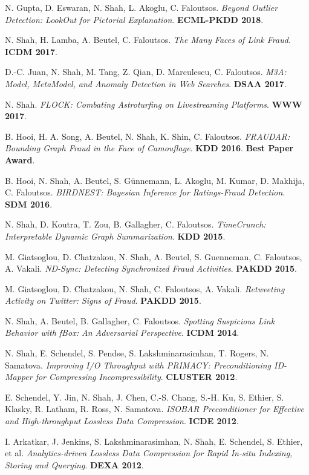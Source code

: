 \documentclass{article}
\begin{document}
\begin{etaremune}[itemsep=1pt,parsep=0pt]
\item N. Gupta, D. Eswaran, N. Shah, L. Akoglu, C. Faloutsos. \emph{Beyond Outlier Detection: LookOut for Pictorial Explanation}. \textbf{ECML-PKDD 2018}.
\item N. Shah, H. Lamba, A. Beutel, C. Faloutsos. \emph{The Many Faces of Link Fraud}. \textbf{ICDM 2017}.
\item D.-C. Juan, N. Shah, M. Tang, Z. Qian, D. Marculescu, C. Faloutsos. \emph{M3A: Model, MetaModel, and Anomaly Detection in Web Searches}. \textbf{DSAA 2017}.
\item N. Shah. \emph{FLOCK: Combating Astroturfing on Livestreaming Platforms}. \textbf{WWW 2017}.
\item B. Hooi, H. A. Song, A. Beutel, N. Shah, K. Shin, C. Faloutsos. \emph{FRAUDAR: Bounding Graph Fraud in the Face of Camouflage}. \textbf{KDD 2016}. \textbf{Best Paper Award}.
\item B. Hooi, N. Shah, A. Beutel, S. Günnemann, L. Akoglu, M. Kumar, D. Makhija, C. Faloutsos. \emph{BIRDNEST: Bayesian Inference for Ratings-Fraud Detection}. \textbf{SDM 2016}.
\item N. Shah, D. Koutra, T. Zou, B. Gallagher, C. Faloutsos. \emph{TimeCrunch: Interpretable Dynamic Graph Summarization}. \textbf{KDD 2015}.
\item M. Giatsoglou, D. Chatzakou, N. Shah, A. Beutel, S. Guenneman, C. Faloutsos, A. Vakali. \emph{ND-Sync: Detecting Synchronized Fraud Activities}. \textbf{PAKDD 2015}.
\item M. Giatsoglou, D. Chatzakou, N. Shah, C. Faloutsos, A. Vakali. \emph{Retweeting Activity on Twitter: Signs of Fraud}. \textbf{PAKDD 2015}.
\item N. Shah, A. Beutel, B. Gallagher, C. Faloutsos. \emph{Spotting Suspicious Link Behavior with fBox: An Adversarial Perspective}. \textbf{ICDM 2014}.
\item N. Shah, E. Schendel, S. Pendse, S. Lakshminarasimhan, T. Rogers, N. Samatova. \emph{Improving I/O Throughput with PRIMACY: Preconditioning ID-Mapper for Compressing Incompressibility}. \textbf{CLUSTER 2012}.
\item E. Schendel, Y. Jin, N. Shah, J. Chen, C.-S. Chang, S.-H. Ku, S. Ethier, S. Klasky, R. Latham, R. Ross, N. Samatova. \emph{ISOBAR Preconditioner for Effective and High-throughput Lossless Data Compression}. \textbf{ICDE 2012}.
\item I. Arkatkar, J. Jenkins, S. Lakshminarasimhan, N. Shah, E. Schendel, S. Ethier, et al. \emph{Analytics-driven Lossless Data Compression for Rapid In-situ Indexing, Storing and Querying}. \textbf{DEXA 2012}.

\end{etaremune}
\end{document}
